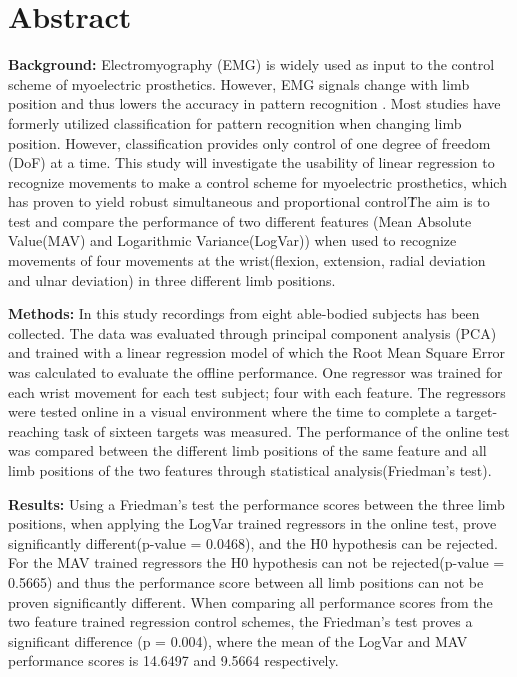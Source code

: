 \section{Abstract}

\textbf{Background:} Electromyography (EMG) is widely used as input to the control scheme of myoelectric prosthetics. However, EMG signals change with limb position and thus lowers the accuracy in pattern recognition \cite{Fougner2010}.%
Most studies have formerly utilized classification for pattern recognition when changing limb position.  
However, classification provides only control of one degree of freedom (DoF) at a time. This study will investigate the usability of linear regression to recognize movements to make a control scheme for myoelectric prosthetics, which has proven to yield robust simultaneous and proportional control\cite{hahne2014}\. The aim is to test and compare the performance of two different features (Mean Absolute Value(MAV) and Logarithmic Variance(LogVar)) when used to recognize movements of four movements at the wrist(flexion, extension, radial deviation and ulnar deviation) in three different limb positions. 


\textbf{Methods:} In this study recordings from eight able-bodied subjects has been collected. The data was evaluated through principal component analysis (PCA) and trained with a linear regression model of which the Root Mean Square Error was calculated to evaluate the offline performance. One regressor was trained for each wrist movement for each test subject; four with each feature. The regressors were tested online in a visual environment where the time to complete a target-reaching task of sixteen targets was measured. The performance of the online test was compared between the different limb positions of the same feature and all limb positions of the two features through statistical analysis(Friedman's test).


\textbf{Results:} 
Using a Friedman's test the performance scores between the three limb positions, when applying the LogVar trained regressors in the online test, prove significantly different(p-value = 0.0468), and the H0 hypothesis can be rejected. For the MAV trained regressors the H0 hypothesis can not be rejected(p-value = 0.5665) and thus the performance score between all limb positions can not be proven significantly different. When comparing all performance scores from the two feature trained regression control schemes, the Friedman's test proves a significant difference (p = 0.004), where the mean of the LogVar and MAV performance scores is 14.6497 and 9.5664 respectively. 

